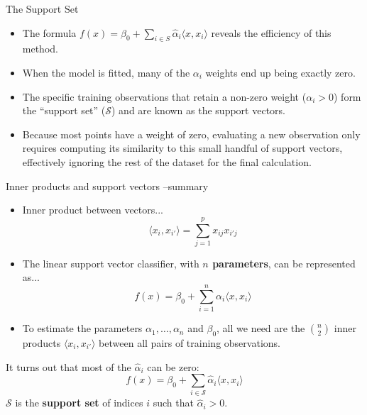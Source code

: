 \documentclass[aspectratio=169, 11pt]{beamer}
\begin{document}
\begin{frame}{The Support Set}
    \begin{itemize}
        \item The formula \(f(x) = \beta_0 + \sum_{i \in S} \hat{\alpha}_i \langle x, x_i \rangle\) reveals the efficiency of this method.
        \item When the model is fitted, many of the \(\alpha_i\) weights end up being exactly zero.
        \item The specific training observations that retain a non-zero weight (\(\alpha_i > 0\)) form the ``support set'' ($\mathcal{S}$) and are known as the support vectors.
        \item Because most points have a weight of zero, evaluating a new observation only requires computing its similarity to this small handful of support vectors, effectively ignoring the rest of the dataset for the final calculation.
    \end{itemize}
\end{frame}

\begin{frame}{Inner products and support vectors --summary}
    \footnotesize
    \begin{itemize}
        \item Inner product between vectors...
        \[ \langle x_{i}, x_{i'} \rangle = \sum_{j=1}^{p} x_{ij} x_{i'j} \]
        \pause

        \item The linear support vector classifier, with \textbf{$n$ parameters}, can be represented as...
        \[ f(x) = \beta_{0} + \sum_{i=1}^{n} \alpha_{i} \langle x, x_{i} \rangle \]
        \pause

        \item To estimate the parameters $\alpha_{1}, \dots, \alpha_{n}$ and $\beta_{0}$, all we need are the $\binom{n}{2}$ inner products $\langle x_{i}, x_{i'} \rangle$ between all pairs of training observations.
    \end{itemize}

    It turns out that most of the $\hat{\alpha}_{i}$ can be zero:
    \[ f(x) = \beta_{0} + \sum_{i \in \mathcal{S}} \hat{\alpha}_{i} \langle x, x_{i} \rangle \]
    $\mathcal{S}$ is the \textbf{support set} of indices $i$ such that $\hat{\alpha}_{i} > 0$.
\end{frame}
\end{document}
